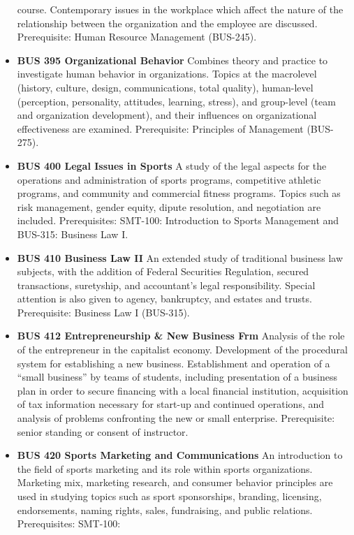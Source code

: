 \documentclass[
  letterpaper,
]{scrbook}
\begin{document}
\begin{itemize}
  course. Contemporary issues in the workplace which affect the nature
  of the relationship between the organization and the employee are
  discussed. Prerequisite: Human Resource Management (BUS-245).
\item
  \textbf{BUS 395 Organizational Behavior} Combines theory and practice
  to investigate human behavior in organizations. Topics at the
  macrolevel (history, culture, design, communications, total quality),
  human-level (perception, personality, attitudes, learning, stress),
  and group-level (team and organization development), and their
  influences on organizational effectiveness are examined. Prerequisite:
  Principles of Management (BUS-275).
\item
  \textbf{BUS 400 Legal Issues in Sports} A study of the legal aspects
  for the operations and administration of sports programs, competitive
  athletic programs, and community and commercial fitness programs.
  Topics such as risk management, gender equity, dipute resolution, and
  negotiation are included. Prerequisites: SMT-100: Introduction to
  Sports Management and BUS-315: Business Law I.
\item
  \textbf{BUS 410 Business Law II} An extended study of traditional
  business law subjects, with the addition of Federal Securities
  Regulation, secured transactions, suretyship, and accountant's legal
  responsibility. Special attention is also given to agency, bankruptcy,
  and estates and trusts. Prerequisite: Business Law I (BUS-315).
\item
  \textbf{BUS 412 Entrepreneurship \& New Business Frm} Analysis of the
  role of the entrepreneur in the capitalist economy. Development of the
  procedural system for establishing a new business. Establishment and
  operation of a ``small business'' by teams of students, including
  presentation of a business plan in order to secure financing with a
  local financial institution, acquisition of tax information necessary
  for start-up and continued operations, and analysis of problems
  confronting the new or small enterprise. Prerequisite: senior standing
  or consent of instructor.
\item
  \textbf{BUS 420 Sports Marketing and Communications} An introduction
  to the field of sports marketing and its role within sports
  organizations. Marketing mix, marketing research, and consumer
  behavior principles are used in studying topics such as sport
  sponsorships, branding, licensing, endorsements, naming rights, sales,
  fundraising, and public relations. Prerequisites: SMT-100:

\end{itemize}
\end{document}

